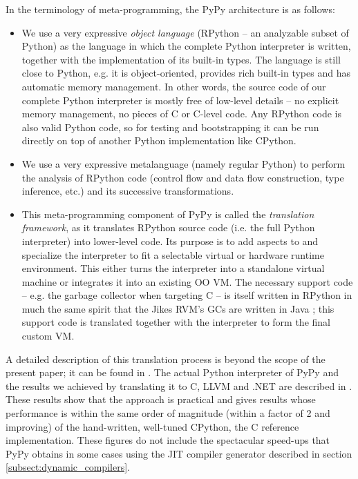\documentclass{llncs}
\begin{document}
In the terminology of meta-programming, the PyPy architecture is as follows:

\begin{itemize}

\item
We use a very expressive \emph{object language} (RPython -- an analyzable
subset of Python) as the language in which the complete Python
interpreter is written, together with the implementation of its
built-in types.  The language is still close to Python, e.g.  it is
object-oriented, provides rich built-in types and has automatic memory
management.  In other words, the source code of our complete Python
interpreter is mostly free of low-level details -- no explicit memory
management, no pieces of C or C-level code.  Any RPython code is also
valid Python code, so for testing and bootstrapping it can be run
directly on top of another Python implementation like CPython.

\item
We use a very expressive metalanguage (namely regular Python) to
perform the analysis of RPython code (control flow and data flow
construction, type inference, etc.) and its successive
transformations.

\item
This meta-programming component of PyPy is called the \emph{translation
framework}, as it translates RPython source code (i.e. the full Python
interpreter) into lower-level code.  Its purpose is to add aspects to
and specialize the interpreter to fit a selectable virtual or hardware
runtime environment.  This either turns the interpreter into a
standalone virtual machine or integrates it into an existing OO VM.
The necessary support code -- e.g. the garbage collector when
targeting C -- is itself written in RPython in much the same spirit
that the Jikes RVM's GCs are written in Java \cite{JikesGC}; this
support code is
translated together with the interpreter to form the final custom VM.
\end{itemize}

A detailed description of this translation process is beyond the scope of the
present paper; it can be found in \cite{pypyvmconstruction}.  The actual Python
interpreter of PyPy and the results we achieved by translating it to C, LLVM
\cite{LLVM} and .NET are described in \cite{architecture} \cite{translationdoc}.
These results show that the
approach is practical and gives results whose performance is within the same
order of magnitude (within a factor of 2 and improving) of the hand-written,
well-tuned CPython, the C reference implementation.  These figures do not
include the spectacular speed-ups that PyPy obtains in some cases using the
JIT compiler generator
described in section \ref{subsect:dynamic_compilers}.
\end{document}
